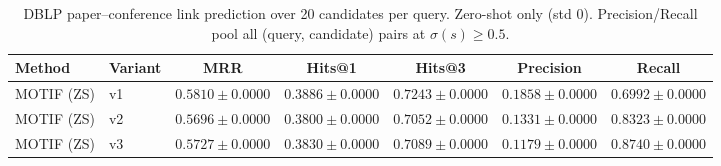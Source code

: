 \begin{table}[t]
\centering
\small
\begin{tabular}{||l||l||c|c|c||c|c||}
\hline
\textbf{Method} & \textbf{Variant} & \textbf{MRR} & \textbf{Hits@1} & \textbf{Hits@3} & \textbf{Precision} & \textbf{Recall} \\
\hline\hline
MOTIF (ZS) & v1 & $0.5810 \pm 0.0000$ & $0.3886 \pm 0.0000$ & $0.7243 \pm 0.0000$ & $0.1858 \pm 0.0000$ & $0.6992 \pm 0.0000$ \\
\hline
MOTIF (ZS) & v2 & $0.5696 \pm 0.0000$ & $0.3800 \pm 0.0000$ & $0.7052 \pm 0.0000$ & $0.1331 \pm 0.0000$ & $0.8323 \pm 0.0000$ \\
\hline
MOTIF (ZS) & v3 & $0.5727 \pm 0.0000$ & $0.3830 \pm 0.0000$ & $0.7089 \pm 0.0000$ & $0.1179 \pm 0.0000$ & $0.8740 \pm 0.0000$ \\
\hline
\end{tabular}
\caption{DBLP paper--conference link prediction over 20 candidates per query. Zero-shot only (std 0). Precision/Recall pool all (query, candidate) pairs at $\sigma(s) \geq 0.5$.}
\label{tab:dblp_paper_conference_seed_performance}
\end{table}
